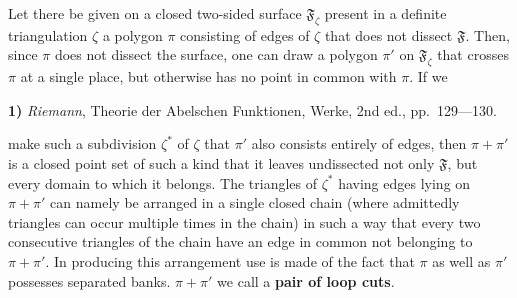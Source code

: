 \documentclass{article}
\begin{document}
Let there be given on a closed two-sided surface $\mathfrak{F}_\zeta$ present in a definite triangulation $\zeta$ a polygon $\pi$ consisting of edges of $\zeta$ that does not dissect $\mathfrak{F}$. Then, since $\pi$ does not dissect the surface, one can draw a polygon $\pi'$ on $\mathfrak{F}_\zeta$ that crosses $\pi$ at a single place, but otherwise has no point in common with $\pi$. If we

\textbf{1)} \emph{Riemann}, Theorie der Abelschen Funktionen, Werke, 2nd ed., pp.~129---130.

make such a subdivision $\zeta^*$ of $\zeta$ that $\pi'$ also consists entirely of edges, then $\pi + \pi'$ is a closed point set of such a kind that it leaves undissected not only $\mathfrak{F}$, but every domain to which it belongs. The triangles of $\zeta^*$ having edges lying on $\pi + \pi'$ can namely be arranged in a single closed chain (where admittedly triangles can occur multiple times in the chain) in such a way that every two consecutive triangles of the chain have an edge in common not belonging to $\pi + \pi'$. In producing this arrangement use is made of the fact that $\pi$ as well as $\pi'$ possesses separated banks. $\pi + \pi'$ we call a \textbf{pair of loop cuts}.

\end{document}
